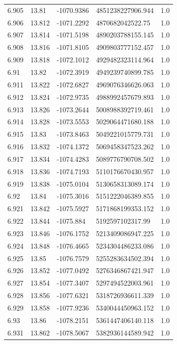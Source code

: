 \begin{tabular}{lllll}
6.905 & 13.81 & -1070.9386 & 4851238227906.944 & 1.0 \\
6.906 & 13.812 & -1071.2292 & 4870682042522.75 & 1.0 \\
6.907 & 13.814 & -1071.5198 & 4890203788155.145 & 1.0 \\
6.908 & 13.816 & -1071.8105 & 4909803777152.457 & 1.0 \\
6.909 & 13.818 & -1072.1012 & 4929482323114.964 & 1.0 \\
6.91 & 13.82 & -1072.3919 & 4949239740899.785 & 1.0 \\
6.911 & 13.822 & -1072.6827 & 4969076346626.063 & 1.0 \\
6.912 & 13.824 & -1072.9735 & 4988992457679.893 & 1.0 \\
6.913 & 13.826 & -1073.2644 & 5008988392719.461 & 1.0 \\
6.914 & 13.828 & -1073.5553 & 5029064471680.188 & 1.0 \\
6.915 & 13.83 & -1073.8463 & 5049221015779.731 & 1.0 \\
6.916 & 13.832 & -1074.1372 & 5069458347523.262 & 1.0 \\
6.917 & 13.834 & -1074.4283 & 5089776790708.502 & 1.0 \\
6.918 & 13.836 & -1074.7193 & 5110176670430.957 & 1.0 \\
6.919 & 13.838 & -1075.0104 & 5130658313089.174 & 1.0 \\
6.92 & 13.84 & -1075.3016 & 5151222046389.855 & 1.0 \\
6.921 & 13.842 & -1075.5927 & 5171868199353.152 & 1.0 \\
6.922 & 13.844 & -1075.884 & 5192597102317.99 & 1.0 \\
6.923 & 13.846 & -1076.1752 & 5213409086947.225 & 1.0 \\
6.924 & 13.848 & -1076.4665 & 5234304486233.086 & 1.0 \\
6.925 & 13.85 & -1076.7579 & 5255283634502.394 & 1.0 \\
6.926 & 13.852 & -1077.0492 & 5276346867421.947 & 1.0 \\
6.927 & 13.854 & -1077.3407 & 5297494522003.961 & 1.0 \\
6.928 & 13.856 & -1077.6321 & 5318726936611.339 & 1.0 \\
6.929 & 13.858 & -1077.9236 & 5340044450963.152 & 1.0 \\
6.93 & 13.86 & -1078.2151 & 5361447406140.118 & 1.0 \\
6.931 & 13.862 & -1078.5067 & 5382936144589.942 & 1.0 \\

\end{tabular}
